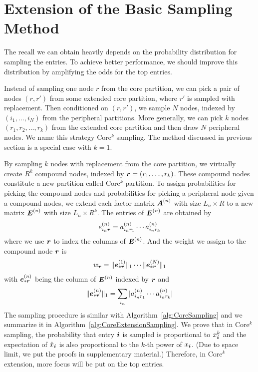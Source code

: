 \documentclass[10pt,journal,compsoc]{IEEEtran}
\newcommand{\Sca}[3]{{#1}^{(#2)}_{i_#2#3}}%
\newcommand{\anr}[2]{\Sca{a}{#1}{#2}}
\newcommand{\enr}[2]{\Sca{e}{#1}{\V{#2}}}
\newcommand{\V}[1]{{\boldsymbol{{\MakeLowercase{#1}}}}}
\newcommand{\ColVec}[3]{\V{#1}^{(#2)}_{#3}}
\newcommand{\NormColE}[2]{\norm{\ColVec{e}{#1}{*\V{#2}}}{1}}
\newcommand{\predx}{\hat{x}_{\V{i}}}
\newcommand{\M}[1]{{\boldsymbol{{\MakeUppercase{#1}}}}}
\newcommand{\FacMat}[2]{\M{#1}^{(#2)}}
\newcommand{\norm}[2]{\|#1\|_{#2}}
\newcommand{\Alg}[1]{Algorithm~\ref{alg:#1}}
\begin{document}
\section{Extension of the Basic Sampling Method} 


The recall we can obtain heavily depends on the probability distribution for sampling the entries. To achieve better performance, we should improve this distribution by amplifying the odds for the top entries.

Instead of sampling one node $r$ from the core partition,
we can pick a pair of nodes $(r,r')$ from some extended core partition,
where $r'$ is sampled with replacement.
Then conditioned on $(r,r')$, we sample $N$ nodes,
indexed by $(i_1,\ldots,i_N)$ from the peripheral partitions.
More generally, we can pick $k$ nodes $(r_1,r_2,\ldots,r_k)$ from the extended core partition
and then draw $N$ peripheral nodes.
We name this strategy Core$^k$ sampling.
The method discussed in previous section is a special case with $k=1$.

By sampling $k$ nodes with replacement from the core partition,
we virtually create $R^k$ compound nodes,
indexed by $\V{r}=(r_1,\ldots,r_k)$.
These compound nodes constitute a new partition called Core$^k$ partition.
To assign probabilities for picking the compound nodes and probabilities for picking a peripheral node given a compound nodes,
we extend each factor matrix $\FacMat{A}{n}$ with size $L_n\times R$ to a new matrix $\M{E}^{(n)}$ with size $L_n\times R^k$.
The entries of $\M{E}^{(n)}$ are obtained by
\begin{align}
\enr{n}{r} = \anr{n}{r_1}\cdots\anr{n}{r_k}
\end{align}
where we use $\V{r}$ to index the columns of $\M{E}^{(n)}$. And the weight we assign to the compound node $\V{r}$ is
\begin{align}
w_{\V{r}} = \NormColE{1}{r}\cdots\NormColE{N}{r}
\end{align}
with $\V{e}_{*\V{r}}^{(n)}$ being the column of $\M{E}^{(n)}$ indexed by $\V{r}$ and
\begin{align}
\NormColE{n}{r} = \sum_{i_n}|\anr{n}{r_1}\cdots\anr{n}{r_k}|
\end{align}
The sampling procedure is similar with \Alg{CoreSampling}
and we summarize it in \Alg{CoreExtensionSampling}.
We prove that in Core$^k$ sampling,
the probability that entry $\V{i}$ is sampled is proportional to $x_{\V{i}}^k$
and the expectation of $\predx$ is also proportional to the $k$-th power of $x_{\V{i}}$.
(Due to space limit, we put the proofs in supplementary material.)
Therefore, in Core$^k$ extension, more focus will be put on the top entries.
\end{document}
